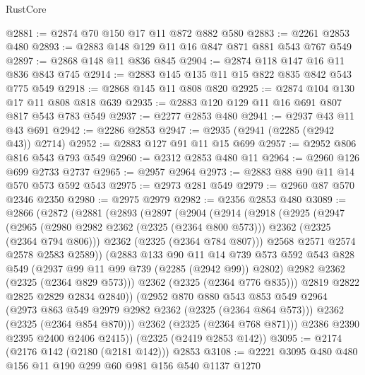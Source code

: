 \begin{lexlean}{RustCore}
\begin{coremodule}
@2881 := @2874 @70 @150 @17 @11 @872 @882 @580
@2883 := @2261 @2853 @480
@2893 := @2883 @148 @129 @11 @16 @847 @871 @881 @543 @767 @549
@2897 := @2868 @148 @11 @836 @845
@2904 := @2874 @118 @147 @16 @11 @836 @843 @745
@2914 := @2883 @145 @135 @11 @15 @822 @835 @842 @543 @775 @549
@2918 := @2868 @145 @11 @808 @820
@2925 := @2874 @104 @130 @17 @11 @808 @818 @639
@2935 := @2883 @120 @129 @11 @16 @691 @807 @817 @543 @783 @549
@2937 := @2277 @2853 @480
@2941 := @2937 @43 @11 @43 @691
@2942 := @2286 @2853
@2947 := @2935 (@2941 (@2285 (@2942 @43)) @2714)
@2952 := @2883 @127 @91 @11 @15 @699
@2957 := @2952 @806 @816 @543 @793 @549
@2960 := @2312 @2853 @480 @11
@2964 := @2960 @126 @699 @2733 @2737
@2965 := @2957 @2964
@2973 := @2883 @88 @90 @11 @14 @570 @573 @592 @543
@2975 := @2973 @281 @549
@2979 := @2960 @87 @570 @2346 @2350
@2980 := @2975 @2979
@2982 := @2356 @2853 @480
@3089 := @2866
    (@2872
      (@2881
        (@2893
          (@2897
            (@2904
              (@2914
                (@2918
                  (@2925
                    (@2947
                      (@2965
                        (@2980 @2982 @2362 (@2325 (@2364 @800 @573)))
                        @2362
                        (@2325 (@2364 @794 @806)))
                      @2362
                      (@2325 (@2364 @784 @807)))
                    @2568
                    @2571
                    @2574
                    @2578
                    @2583
                    @2589))
                (@2883
                  @133
                  @90
                  @11
                  @14
                  @739
                  @573
                  @592
                  @543
                  @828
                  @549
                  (@2937 @99 @11 @99 @739 (@2285 (@2942 @99)) @2802)
                  @2982
                  @2362
                  (@2325 (@2364 @829 @573)))
                @2362
                (@2325 (@2364 @776 @835)))
              @2819
              @2822
              @2825
              @2829
              @2834
              @2840))
          (@2952
            @870
            @880
            @543
            @853
            @549
            @2964
            (@2973 @863 @549 @2979 @2982 @2362 (@2325 (@2364 @864 @573)))
            @2362
            (@2325 (@2364 @854 @870)))
          @2362
          (@2325 (@2364 @768 @871)))
        @2386
        @2390
        @2395
        @2400
        @2406
        @2415))
    (@2325 (@2419 @2853 @142))
@3095 := @2174 (@2176 @142 (@2180 (@2181 @142))) @2853
@3108 := @2221 @3095 @480 @480 @156 @11 @190 @299 @60 @981 @156 @540 @1137 @1270

\end{coremodule}
\end{lexlean}
